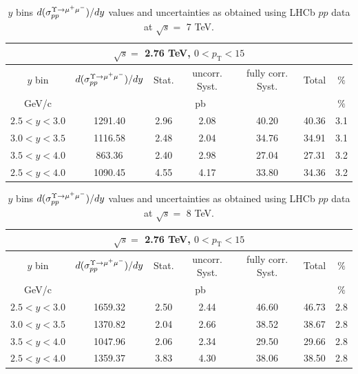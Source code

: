 \begin{table}[!tp]
\begin{center}
\begin{tabular}{|c||c|c|c|c|c|c|}
  \hline
  \multicolumn{7}{|c|}{$\sqrt{s}=$ 2.76 TeV, $0<p_\mathrm{T}<15$}\\
  \hline
  $y$ bin & $d(\sigma_{pp}^{\Upsilon\rightarrow \mu^{+}\mu^{\--}})/dy $ & Stat. & uncorr. Syst. & fully corr. Syst. & Total & $\%$ \\
  \hline
  GeV/c & \multicolumn{5}{c|}{pb} & $\%$ \\
  \hline
  $2.5 < y < 3.0 $ & 1291.40 & 2.96 & 2.08 & 40.20 & 40.36 & 3.1 \\
  \hline
  $3.0 < y < 3.5 $& 1116.58 & 2.48 & 2.04 & 34.76 & 34.91 & 3.1 \\
  \hline
  $3.5 < y < 4.0 $& 863.36 & 2.40 & 2.98 & 27.04 & 27.31 & 3.2 \\
  \hline
  $2.5 < y < 4.0 $& 1090.45 & 4.55 & 4.17 & 33.80 & 34.36 & 3.2 \\
  \hline
\end{tabular}
\caption{$y$ bins $d(\sigma_{pp}^{\Upsilon\rightarrow \mu^{+}\mu^{\--}})/dy $ values and uncertainties as obtained using LHCb $pp$ data at $\sqrt{s}=$ 7 TeV.}\label{table:LHCbY1sData7}
\end{center}
\end{table}

\begin{table}[!tp]
\begin{center}
\begin{tabular}{|c||c|c|c|c|c|c|}
  \hline
  \multicolumn{7}{|c|}{$\sqrt{s}=$ 2.76 TeV, $0<p_\mathrm{T}<15$}\\
  \hline
  $y$ bin & $d(\sigma_{pp}^{\Upsilon\rightarrow \mu^{+}\mu^{\--}})/dy $ & Stat. & uncorr. Syst. & fully corr. Syst. & Total & $\%$ \\
  \hline
  GeV/c & \multicolumn{5}{c|}{pb} & $\%$ \\
  \hline
  $2.5 < y < 3.0 $ & 1659.32 & 2.50 & 2.44 & 46.60 & 46.73 & 2.8 \\
  \hline
  $3.0 < y < 3.5 $& 1370.82 & 2.04 & 2.66 & 38.52 & 38.67 & 2.8 \\
  \hline
  $3.5 < y < 4.0 $& 1047.96 & 2.06 & 2.34 & 29.50 & 29.66 & 2.8 \\
  \hline
  $2.5 < y < 4.0 $& 1359.37 & 3.83 & 4.30 & 38.06 & 38.50 & 2.8 \\
  \hline
\end{tabular}
\caption{$y$ bins $d(\sigma_{pp}^{\Upsilon\rightarrow \mu^{+}\mu^{\--}})/dy $ values and uncertainties as obtained using LHCb $pp$ data at $\sqrt{s}=$ 8 TeV.}\label{table:LHCbY1sData8}
\end{center}
\end{table}

